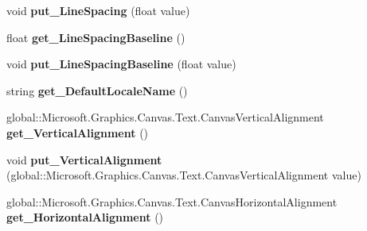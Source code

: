 \begin{DoxyCompactItemize}
\mbox{\label{class_microsoft_1_1_graphics_1_1_canvas_1_1_text_1_1_canvas_text_layout_a7c82d3de6c686f707211c78624514bf5}} 
void {\bfseries put\+\_\+\+Line\+Spacing} (float value)
\item 
\mbox{\label{class_microsoft_1_1_graphics_1_1_canvas_1_1_text_1_1_canvas_text_layout_a42141c8d17b56df867588b4c899cc69b}} 
float {\bfseries get\+\_\+\+Line\+Spacing\+Baseline} ()
\item 
\mbox{\label{class_microsoft_1_1_graphics_1_1_canvas_1_1_text_1_1_canvas_text_layout_a99e3ed24c59e7bfd54565cc446c0c953}} 
void {\bfseries put\+\_\+\+Line\+Spacing\+Baseline} (float value)
\item 
\mbox{\label{class_microsoft_1_1_graphics_1_1_canvas_1_1_text_1_1_canvas_text_layout_aadc5db8c747feb51e16332edb9439baf}} 
string {\bfseries get\+\_\+\+Default\+Locale\+Name} ()
\item 
\mbox{\label{class_microsoft_1_1_graphics_1_1_canvas_1_1_text_1_1_canvas_text_layout_adeddc6c9b2e6402b8d8645e0a439a2dd}} 
global\+::\+Microsoft.\+Graphics.\+Canvas.\+Text.\+Canvas\+Vertical\+Alignment {\bfseries get\+\_\+\+Vertical\+Alignment} ()
\item 
\mbox{\label{class_microsoft_1_1_graphics_1_1_canvas_1_1_text_1_1_canvas_text_layout_a62984a3697135681afc6b8776f3df132}} 
void {\bfseries put\+\_\+\+Vertical\+Alignment} (global\+::\+Microsoft.\+Graphics.\+Canvas.\+Text.\+Canvas\+Vertical\+Alignment value)
\item 
\mbox{\label{class_microsoft_1_1_graphics_1_1_canvas_1_1_text_1_1_canvas_text_layout_a3b97a0cf1741dc7db0af0729a4a4fd99}} 
global\+::\+Microsoft.\+Graphics.\+Canvas.\+Text.\+Canvas\+Horizontal\+Alignment {\bfseries get\+\_\+\+Horizontal\+Alignment} ()
\item 

\end{DoxyCompactItemize}
